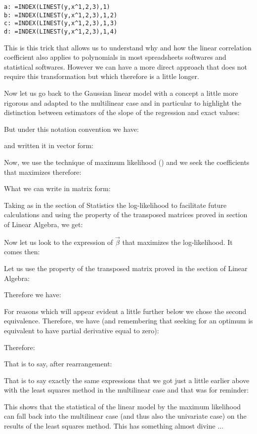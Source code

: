 	\texttt{a: =INDEX(LINEST(y,x\string^{1,2,3}),1)\\
	b: =INDEX(LINEST(y,x\string^{1,2,3}),1,2)\\
	c: =INDEX(LINEST(y,x\string^{1,2,3}),1,3)\\
	d: =INDEX(LINEST(y,x\string^{1,2,3}),1,4)}
	
	This is this trick that allows us to understand why and how the linear correlation coefficient also applies to polynomials in most spreadsheets softwares and statistical softwares. However we can have a more direct approach that does not require this transformation but which therefore is a little longer.
	
	Now let us go back to the Gaussian linear model with a concept a little more rigorous and adapted to the multilinear case and in particular to highlight the distinction between estimators of the slope of the regression and exact values:
	
	But under this notation convention we have:
	
	and written it in vector form:
	
	Now, we use the technique of maximum likelihood () and we seek the coefficients that maximizes therefore:
	
	What we can write in matrix form:
	
	Taking as in the section of Statistics the log-likelihood to facilitate future calculations and using the property of the transposed matrices proved in section of Linear Algebra, we get:
	
	Now let us look to the expression of $\vec{\beta}$ that maximizes the log-likelihood. It comes then:
	
	Let us use the property of the transposed matrix proved in the section of Linear Algebra:
	
	Therefore we have:
	
	For reasons which will appear evident a little further below we chose the second equivalence. Therefore, we have (and remembering that seeking for an optimum is equivalent to have partial derivative equal to zero):
	
	Therefore:
	
	That is to say, after rearrangement:
	
	That is to say exactly the same expressions that we got just a little earlier above with the least squares method in the multilinear case and that was for reminder:
	
	This shows that the statistical of the linear model by the maximum likelihood can fall back into the multilinear case (and thus also the univariate case) on the results of the least squares method. This has something almost divine ...
	
